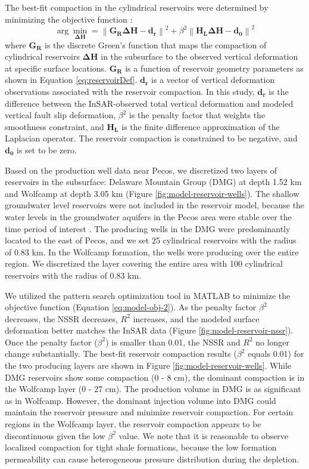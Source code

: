 \documentclass[draft,grl]{agutexSI2019}
\begin{document}
\begin{article}
The best-fit compaction in the cylindrical reservoirs were determined by minimizing the objective function \cite{Du2001}:
\begin{equation}
\arg \min_{\mathbf{\Delta H}} =\left \| \mathbf{G_R}\mathbf{\Delta H}-\mathbf{d_r} \right \|^2+\beta ^2\left \| \mathbf{H_L}\mathbf{\Delta H}-\mathbf{d_0} \right \|^2  \label{eq:model-obj-2}
\end{equation}
where $ \mathbf{G_R} $ is the discrete Green’s function that maps the compaction of cylindrical reservoirs $\mathbf{\Delta H}$ in the subsurface to the observed vertical deformation at specific surface locations. $\mathbf{G_R}$ is a function of reservoir geometry parameters as shown in Equation \eqref{eq:reservoirDef}. $\mathbf{d_r}$ is a vector of vertical deformation observations associated with the reservoir compaction. In this study, $\mathbf{d_r}$ is the difference between the InSAR-observed total vertical deformation and modeled vertical fault slip deformation, $ \beta^2 $ is the penalty factor that weights the smoothness constraint, and $ \mathbf{H_L} $ is the finite difference approximation of the Laplacian operator. The reservoir compaction is constrained to be negative, and $\mathbf{d_0} $ is set to be zero. 

Based on the production well data near Pecos, we discretized two layers of reservoirs in the subsurface: Delaware Mountain Group (DMG) at depth 1.52 km and Wolfcamp at depth 3.05 km (Figure \ref{fig:model-reservoir-wells}). The shallow groundwater level reservoirs were not included in the reservoir model, because the water levels in the groundwater aquifers in the Pecos area were stable over the time period of interest \cite{deng2020surface}. The producing wells in the DMG were predominantly located to the east of Pecos, and we set 25 cylindrical reservoirs with the radius of 0.83 km. In the Wolfcamp formation, the wells were producing over the entire region. We discretized the layer covering the entire area with 100 cylindrical reservoirs with the radius of 0.83 km.  

We utilized the pattern search optimization tool in MATLAB to minimize the objective function (Equation \eqref{eq:model-obj-2}). As the penalty factor $\beta^2$ decreases, the NSSR decreases, $ R^2 $ increases, and the modeled surface deformation better matches the InSAR data (Figure \ref{fig:model-reservoir-nssr}). Once the penalty factor ($ \beta^2 $) is smaller than 0.01, the NSSR and $ R^2 $ no longer change substantially. The best-fit reservoir compaction results ($ \beta^2 $ equals 0.01) for the two producing layers are shown in Figure \ref{fig:model-reservoir-wells}. While DMG reservoirs show some compaction (0 - 8 cm), the dominant compaction is in the Wolfcamp layer (0 - 27 cm). The production volume in DMG is as significant as in Wolfcamp. However, the dominant injection volume into DMG could maintain the reservoir pressure and minimize reservoir compaction. For certain regions in the Wolfcamp layer, the reservoir compaction appears to be discontinuous given the low $ \beta^2 $ value. We note that it is reasonable to observe localized compaction for tight shale formations, because the low formation permeability can cause heterogeneous pressure distribution during the depletion.


\end{article}
\end{document}
